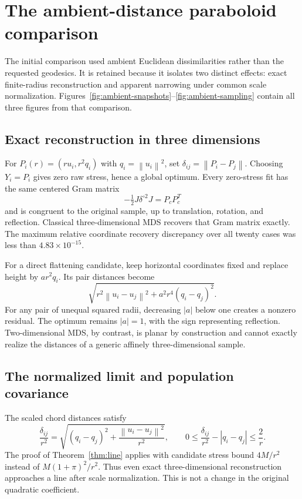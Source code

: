 \documentclass[11pt]{article}
\theoremstyle{remark}\newtheorem{remark}[proposition]{Remark}
\newcommand{\norm}[1]{\left\lVert#1\right\rVert}
\begin{document}
\section{The ambient-distance paraboloid comparison}\label{app:ambient}

The initial comparison used ambient Euclidean dissimilarities rather than the
requested geodesics. It is retained because it isolates two distinct effects:
exact finite-radius reconstruction and apparent narrowing under common scale
normalization. Figures~\ref{fig:ambient-snapshots}--\ref{fig:ambient-sampling}
contain all three figures from that comparison.

\subsection{Exact reconstruction in three dimensions}
For $P_i(r)=(ru_i,r^2q_i)$ with $q_i=\norm{u_i}^2$, set
$\delta_{ij}=\norm{P_i-P_j}$. Choosing $Y_i=P_i$ gives zero raw stress, hence a
global optimum. Every zero-stress fit has the same centered Gram matrix
\begin{equation}
 -\tfrac12J\delta^{\circ2}J=P_cP_c^T
\end{equation}
and is congruent to the original sample, up to translation, rotation, and
reflection. Classical three-dimensional MDS recovers that Gram matrix exactly.
The maximum relative coordinate recovery discrepancy over all twenty cases
was less than $4.83\times10^{-15}$.

For a direct flattening candidate, keep horizontal coordinates fixed and
replace height by $a r^2q_i$. Its pair distances become
\begin{equation}
 \sqrt{r^2\norm{u_i-u_j}^2+a^2r^4(q_i-q_j)^2}.
\end{equation}
For any pair of unequal squared radii, decreasing $|a|$ below one creates a
nonzero residual. The optimum remains $|a|=1$, with the sign representing
reflection. Two-dimensional MDS, by contrast, is planar by construction and
cannot exactly realize the distances of a generic affinely three-dimensional
sample.

\subsection{The normalized limit and population covariance}
The scaled chord distances satisfy
\begin{equation}
 \frac{\delta_{ij}}{r^2}
 =\sqrt{(q_i-q_j)^2+\frac{\norm{u_i-u_j}^2}{r^2}},\qquad
 0\le\frac{\delta_{ij}}{r^2}-|q_i-q_j|\le\frac2r.
\end{equation}
The proof of Theorem~\ref{thm:line} applies with candidate stress bound
$4M/r^2$ instead of $M(1+\pi)^2/r^2$. Thus even exact three-dimensional
reconstruction approaches a line after scale normalization. This is not a
change in the original quadratic coefficient.
\end{document}
